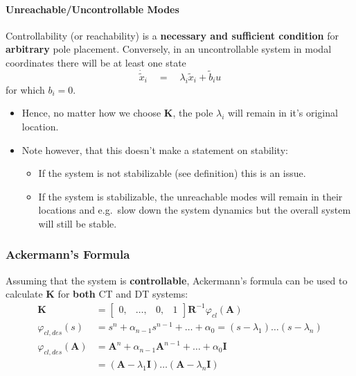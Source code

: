 \paragraph{Unreachable/Uncontrollable Modes}
Controllability (or reachability) is a \textbf{necessary and sufficient condition} for \textbf{arbitrary} pole placement.
Conversely, in an uncontrollable system in modal coordinates there will be at least one state
\begin{equation*}
    \dot{\tilde{x}}_i\quad=\quad\lambda_i\tilde{x}_i+\tilde{b}_i u
\end{equation*}
for which $b_i=0$.
\begin{itemize}
    \item Hence, no matter how we choose $\mathbf{K}$, the pole $\lambda_i$ will remain in it's original location.
    \item Note however, that this doesn't make a statement on stability:
          \begin{itemize}
              \item If the system is not stabilizable (see definition) this is an issue.
              \item If the system is stabilizable, the unreachable modes will remain in their locations and e.g.\ slow down the system dynamics but the overall system will still be stable.
          \end{itemize}
\end{itemize}

\subsubsection{Ackermann's Formula}
Assuming that the system is \textbf{controllable}, Ackermann's formula can be used to calculate $\mathbf{K}$ for \textbf{both} CT and DT systems:
\noindent\begin{align*}
    \mathbf{K}               & =\begin{bmatrix}
                                    0, & \ldots, & 0, & 1
                                \end{bmatrix}
    \mathbf{R}^{-1}\varphi_{cl}(\mathbf{A})                                                               \\
    \varphi_{cl,des}(s)          & =s^n+\alpha_{n-1}s^{n-1}+\ldots+\alpha_0=(s-\lambda_1)\ldots(s-\lambda_n)  \\
    \varphi_{cl,des}(\mathbf{A}) & =\mathbf{A}^n+\alpha_{n-1}\mathbf{A}^{n-1}+\ldots+\alpha_0 \mathbf{I}      \\
                             & = (\mathbf{A}-\lambda_1 \mathbf{I})\ldots(\mathbf{A}-\lambda_n \mathbf{I})
\end{align*}

